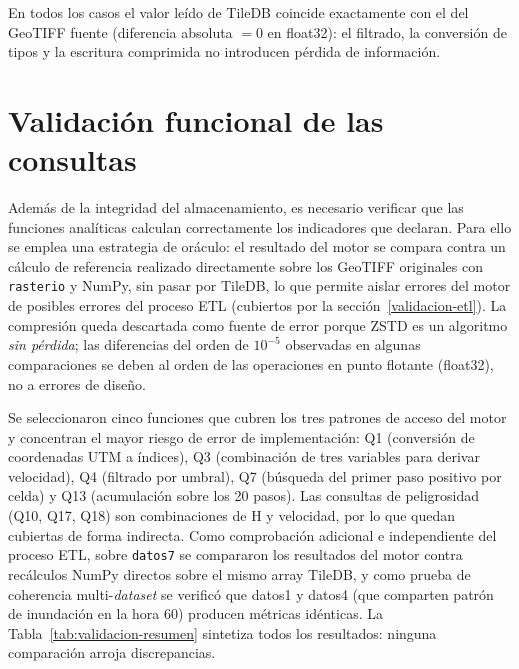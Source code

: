 En todos los casos el valor leído de TileDB coincide exactamente con el del GeoTIFF fuente (diferencia absoluta $= 0$ en float32): el filtrado, la conversión de tipos y la escritura comprimida no introducen pérdida de información.

\FloatBarrier
\section{Validación funcional de las consultas}\label{validacion-funcional}

Además de la integridad del almacenamiento, es necesario verificar que las funciones analíticas calculan correctamente los indicadores que declaran. Para ello se emplea una estrategia de oráculo: el resultado del motor se compara contra un cálculo de referencia realizado directamente sobre los GeoTIFF originales con \texttt{rasterio} y NumPy, sin pasar por TileDB, lo que permite aislar errores del motor de posibles errores del proceso ETL (cubiertos por la sección~\ref{validacion-etl}). La compresión queda descartada como fuente de error porque ZSTD es un algoritmo \emph{sin pérdida}; las diferencias del orden de $10^{-5}$ observadas en algunas comparaciones se deben al orden de las operaciones en punto flotante (float32), no a errores de diseño.

Se seleccionaron cinco funciones que cubren los tres patrones de acceso del motor y concentran el mayor riesgo de error de implementación: Q1 (conversión de coordenadas UTM a índices), Q3 (combinación de tres variables para derivar velocidad), Q4 (filtrado por umbral), Q7 (búsqueda del primer paso positivo por celda) y Q13 (acumulación sobre los 20 pasos). Las consultas de peligrosidad (Q10, Q17, Q18) son combinaciones de H y velocidad, por lo que quedan cubiertas de forma indirecta. Como comprobación adicional e independiente del proceso ETL, sobre \texttt{datos7} se compararon los resultados del motor contra recálculos NumPy directos sobre el mismo array TileDB, y como prueba de coherencia multi-\textit{dataset} se verificó que datos1 y datos4 (que comparten patrón de inundación en la hora 60) producen métricas idénticas. La Tabla~\ref{tab:validacion-resumen} sintetiza todos los resultados: ninguna comparación arroja discrepancias.

